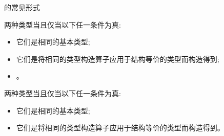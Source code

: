 
\begin{frame}{}
  \begin{center}

    \vspace{0.30cm}
  \end{center}
\end{frame}

\begin{frame}{}
  \begin{center}
    的常见形式

  \end{center}
\end{frame}

\begin{frame}{}
  \begin{center}
  \end{center}
\end{frame}

\begin{frame}{}
  \begin{center}
    \begin{definition}
      两种类型当且仅当以下任一条件为真:
      \begin{itemize}
        \item 它们是相同的基本类型;
        \item 它们是将相同的类型构造算子应用于结构等价的类型而构造得到;
        \item {}。
      \end{itemize}
    \end{definition}

    \pause
    \vspace{0.80cm}
    \begin{definition}
      两种类型当且仅当以下任一条件为真:
      \begin{itemize}
        \item 它们是相同的基本类型;
        \item 它们是将相同的类型构造算子应用于结构等价的类型而构造得到。
      \end{itemize}
    \end{definition}
  \end{center}
\end{frame}

